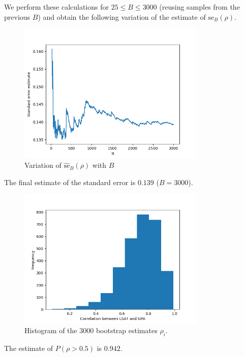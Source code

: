 \documentclass[10pt]{article}
\begin{document}
    We perform these calculations for $25 \leq B \leq 3000$ (reusing samples from the
    previous $B$) and obtain the following variation of the estimate of
    $\text{se}_B(\rho)$.


    \begin{figure}[H]
    \begin{center}
        \includegraphics[width=0.8\textwidth]{bootstrap/errors.png}
    \end{center}
    \caption{Variation of $\hat{\text{se}}_{B}(\rho)$ with $B$}
    \label{fig:bootstrap_error}
    \end{figure}

    The final estimate of the standard error is $0.139$ ($B = 3000$).

    \begin{figure}[H]
    \begin{center}
        \includegraphics[width=0.8\textwidth]{bootstrap/correlations.png}
    \end{center}
    \caption{Histogram of the 3000 bootstrap estimates $\rho_i$.}
    \label{fig:bootstrap_error}
    \end{figure}

    The estimate of $P(\rho > 0.5)$ is $0.942$.
\end{document}
